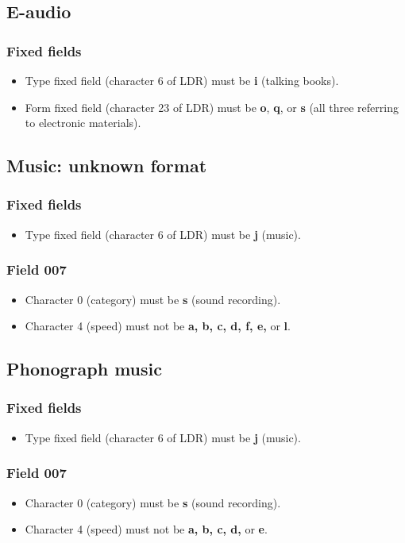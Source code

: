 \documentclass[a4paper,10pt]{amsart}
\begin{document}
\subsection{E-audio}
\subsubsection*{Fixed fields}
\begin{itemize}
 \item Type fixed field (character 6 of LDR) must be {\bf i} (talking books).
 \item Form fixed field (character 23 of LDR) must be {\bf o}, {\bf q}, or {\bf s} (all three referring to electronic materials).
\end{itemize}


\subsection{Music: unknown format}
\subsubsection*{Fixed fields}
\begin{itemize}
 \item Type fixed field (character 6 of LDR) must be {\bf j} (music).
\end{itemize}
\subsubsection*{Field 007}
\begin{itemize}
 \item Character 0 (category) must be {\bf s} (sound recording).
 \item Character 4 (speed) must not be {\bf a, b, c, d, f, e,} or {\bf l}.
\end{itemize}


\subsection{Phonograph music}
\subsubsection*{Fixed fields}
\begin{itemize}
 \item Type fixed field (character 6 of LDR) must be {\bf j} (music).
\end{itemize}
\subsubsection*{Field 007}
\begin{itemize}
 \item Character 0 (category) must be {\bf s} (sound recording).
 \item Character 4 (speed) must not be {\bf a, b, c, d,} or {\bf e}.
\end{itemize}
\end{document}

